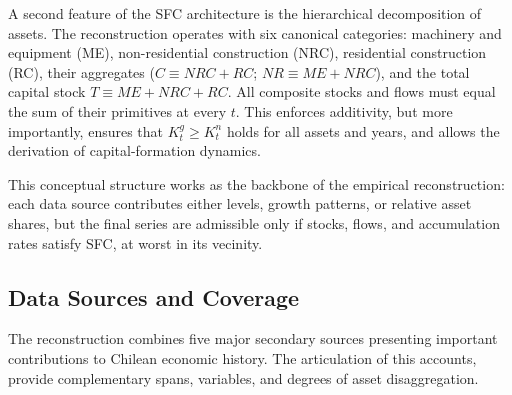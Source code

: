 \documentclass[11pt,a4paper]{article}
\begin{document}
A second feature of the SFC architecture is the hierarchical decomposition of assets. The reconstruction operates with six canonical categories: machinery and equipment (ME), non-residential construction (NRC), residential construction (RC), their aggregates ($C \equiv NRC + RC$; $NR \equiv ME + NRC$), and the total capital stock $T \equiv ME + NRC + RC$. All composite stocks and flows must equal the sum of their primitives at every $t$. This enforces additivity, but more importantly, ensures that $K^g_t \geq K^n_t$ holds for all assets and years, and allows the derivation of capital-formation dynamics. 

This conceptual structure works as the backbone of the empirical reconstruction: each data source contributes either levels, growth patterns, or relative asset shares, but the final series are admissible only if stocks, flows, and accumulation rates satisfy SFC, at worst in its vecinity. 

\subsection{Data Sources and Coverage}

The reconstruction combines five major secondary sources presenting important contributions to Chilean economic history. The articulation of this accounts, provide complementary spans, variables, and degrees of asset disaggregation. 
\end{document}
